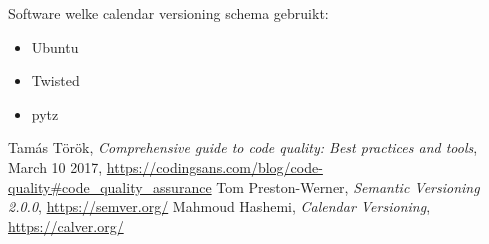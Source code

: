 \documentclass[12pt]{article}
\begin{document}
Software welke calendar versioning schema gebruikt:
\begin{itemize}
	\item Ubuntu
	\item Twisted
	\item pytz
\end{itemize}

\begin{thebibliography}{9}
		Tamás Török,
		\textit{Comprehensive guide to code quality: Best practices and tools},
		March 10 2017,
		\url{https://codingsans.com/blog/code-quality#code_quality_assurance}
		Tom Preston-Werner,
		\textit{Semantic Versioning 2.0.0},
		\url{https://semver.org/}
		Mahmoud Hashemi,
		\textit{Calendar Versioning},
		\url{https://calver.org/}
\end{thebibliography}
\end{document}
